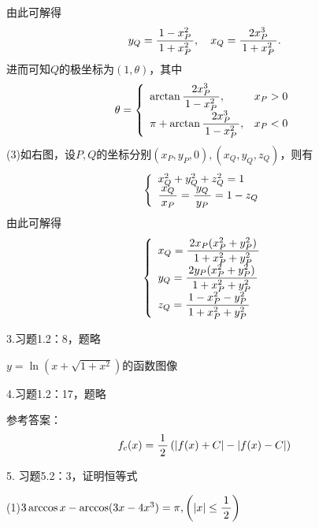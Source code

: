由此可解得
$$y_Q=\displaystyle\frac{\,{1-x^2_P}\,}{\,{1+x^2_P}\,},\quad x_Q=\displaystyle\frac{\,{2x_P^3}\,}{\,{1+x^2_P}\,}.$$
进而可知$Q$的极坐标为$(1,\theta)$，其中
$$\theta=
\left\{
\begin{array}{ll}
	\arctan\displaystyle\frac{\,{2x^3_P}\,}{\,{1-x^2_P}\,},& x_P>0\\
	\pi+\arctan\displaystyle\frac{\,{2x^3_P}\,}{\,{1-x^2_P}\,}, & x_P<0
\end{array}
\right.
$$
(3)如右图，设$P,Q$的坐标分别$(x_P,y_P,0),(x_Q,y_Q,z_Q)$，则有
$$
\left\{
\begin{array}{l}
	x^2_Q+y^2_Q+z^2_Q=1\\
	\displaystyle\frac{\,{x_Q}\,}{\,{x_P}\,}=\displaystyle\frac{\,{y_Q}\,}{\,{y_P}\,}=1-z_Q
\end{array}
\right.
$$
由此可解得
$$
\left\{
\begin{array}{l}
	x_Q=\displaystyle\frac{\,{2x_P(x^2_P+y^2_P)}\,}{\,{1+x^2_P+y^2_P}\,}\\
	y_Q=\displaystyle\frac{\,{2y_P(x^2_P+y^2_P)}\,}{\,{1+x^2_P+y^2_P}\,}\\
	z_Q=\displaystyle\frac{\,{1-x^2_P-y^2_P}\,}{\,{1+x^2_P+y^2_P}\,}
\end{array}
\right.
$$

\bigskip

3.习题1.2：8，题略

\begin{center}
	
	$y=\ln(x+\sqrt{1+x^2})$的函数图像
\end{center}

\bigskip

4.习题1.2：17，题略

参考答案：
$$f_c(x)=\displaystyle\frac{\,{1}\,}{\,{2}\,}\left(|f(x)+C|-|f(x)-C|\right)$$

\bigskip

5. 习题5.2：3，证明恒等式

(1)$3\arccos x-\arccos(3x-4x^3)=\pi,\left(|x|\leq\displaystyle\frac{\,{1}\,}{\,{2}\,}\right)$

